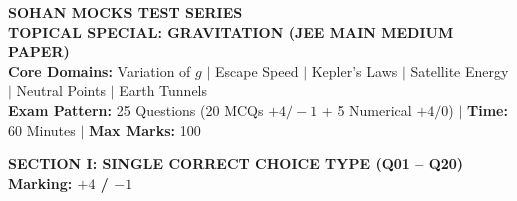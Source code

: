 \documentclass[11pt,a4paper]{article}
\begin{document}
\begin{tcolorbox}[dayheader]
\begin{center}
  {\Large \textbf{\textsf{\textcolor{goldAccent}{SOHAN MOCKS TEST SERIES}}}}\\[3pt]
  {\LARGE \textbf{\textsf{TOPICAL SPECIAL: GRAVITATION (JEE MAIN MEDIUM PAPER)}}}\\[5pt]
  {\normalsize \textbf{\textsf{Core Domains:}} Variation of $g$ $\vert$ Escape Speed $\vert$ Kepler's Laws $\vert$ Satellite Energy $\vert$ Neutral Points $\vert$ Earth Tunnels}\\[3pt]
  {\footnotesize \textbf{Exam Pattern:} 25 Questions (20 MCQs $+4/-1$ + 5 Numerical $+4/0$) \quad $\vert$ \quad \textbf{Time:} 60 Minutes \quad $\vert$ \quad \textbf{Max Marks:} 100}
\end{center}
\end{tcolorbox}

\vspace{6pt}

\begin{tcolorbox}[sectionbanner]
  {\large \textbf{\textsf{SECTION I: SINGLE CORRECT CHOICE TYPE (Q01 -- Q20)}}} \hfill {\small \textbf{Marking: $+4$ / $-1$}}
\end{tcolorbox}
\vspace{4pt}
\end{document}

